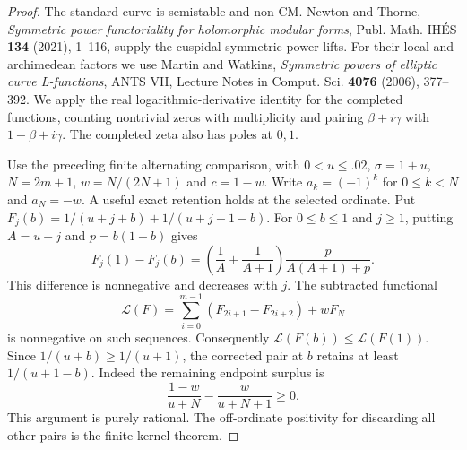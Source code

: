 \documentclass[11pt]{article}
\begin{document}
\begin{proof}
The standard curve is semistable and non-CM. Newton and Thorne, \emph{Symmetric power functoriality for holomorphic modular forms}, Publ. Math. IHÉS \textbf{134} (2021), 1--116, supply the cuspidal symmetric-power lifts. For their local and archimedean factors we use Martin and Watkins, \emph{Symmetric powers of elliptic curve L-functions}, ANTS VII, Lecture Notes in Comput. Sci. \textbf{4076} (2006), 377--392. We apply the real logarithmic-derivative identity for the completed functions, counting nontrivial zeros with multiplicity and pairing $\beta+i\gamma$ with $1-\beta+i\gamma$. The completed zeta also has poles at $0,1$.

Use the preceding finite alternating comparison, with $0<u\le .02$, $\sigma=1+u$, $N=2m+1$, $w=N/(2N+1)$ and $c=1-w$. Write $a_k=(-1)^k$ for $0\le k<N$ and $a_N=-w$. A useful exact retention holds at the selected ordinate. Put $F_j(b)=1/(u+j+b)+1/(u+j+1-b)$. For $0\le b\le1$ and $j\ge1$, putting $A=u+j$ and $p=b(1-b)$ gives
\[
 F_j(1)-F_j(b)=
  \left(\frac1A+\frac1{A+1}\right)\frac{p}{A(A+1)+p}.
\]
This difference is nonnegative and decreases with $j$. The subtracted functional
\[
 \mathcal L(F)=\sum_{i=0}^{m-1}(F_{2i+1}-F_{2i+2})+w F_N
\]
is nonnegative on such sequences. Consequently $\mathcal L(F(b))\le\mathcal L(F(1))$. Since $1/(u+b)\ge1/(u+1)$, the corrected pair at $b$ retains at least $1/(u+1-b)$. Indeed the remaining endpoint surplus is
\[
      \frac{1-w}{u+N}-\frac{w}{u+N+1}\ge0 .
\]
This argument is purely rational. The off-ordinate positivity for discarding all other pairs is the finite-kernel theorem.


\end{proof}
\end{document}
